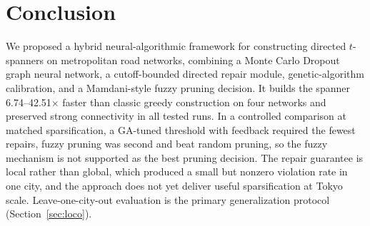 \documentclass[journal]{IEEEtran}
\begin{document}
\section{Conclusion}
We proposed a hybrid neural-algorithmic framework for constructing directed $t$-spanners on metropolitan road networks, combining a Monte Carlo Dropout graph neural network, a cutoff-bounded directed repair module, genetic-algorithm calibration, and a Mamdani-style fuzzy pruning decision. It builds the spanner 6.74--42.51$\times$ faster than classic greedy construction on four networks and preserved strong connectivity in all tested runs. In a controlled comparison at matched sparsification, a GA-tuned threshold with feedback required the fewest repairs, fuzzy pruning was second and beat random pruning, so the fuzzy mechanism is not supported as the best pruning decision. The repair guarantee is local rather than global, which produced a small but nonzero violation rate in one city, and the approach does not yet deliver useful sparsification at Tokyo scale. Leave-one-city-out evaluation is the primary generalization protocol (Section~\ref{sec:loco}).
\end{document}
